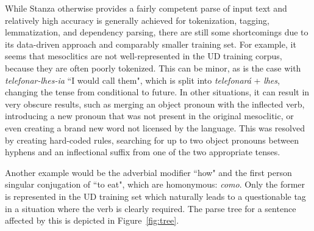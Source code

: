 \begin{exe}
\end{exe}

While Stanza otherwise provides a fairly competent parse of input text and relatively high accuracy is generally achieved for tokenization, tagging, lemmatization, and dependency parsing, there are still some shortcomings due to its data-driven approach and comparably smaller training set. For example, it seems that mesoclitics are not well-represented in the UD training corpus, because they are often poorly tokenized. This can be minor, as is the case with \textit{telefonar-lhes-ia} ``I would call them", which is split into \textit{telefonará} + \textit{lhes}, changing the tense from conditional to future. In other situations, it can result in very obscure results, such as merging an object pronoun with the inflected verb, introducing a new pronoun that was not present in the original mesoclitic, or even creating a brand new word not licensed by the language. This was resolved by creating hard-coded rules, searching for up to two object pronouns between hyphens and an inflectional suffix from one of the two appropriate tenses.

Another example would be the adverbial modifier ``how" and the first person singular conjugation of ``to eat", which are homonymous: \textit{como}. Only the former is represented in the UD training set which naturally leads to a questionable tag in a situation where the verb is clearly required. The parse tree for a sentence affected by this is depicted in Figure~\ref{fig:tree}.

